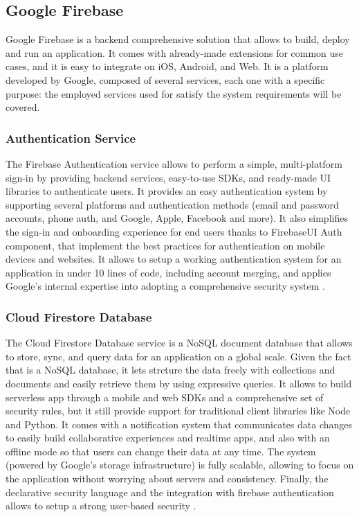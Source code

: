 \subsection{Google Firebase}
Google Firebase is a backend comprehensive solution that allows to build, deploy and run an application. It comes with already-made extensions for common use cases, and it is easy to integrate on iOS, Android, and Web. It is a platform developed by Google, composed of several services, each one with a specific purpose: the employed services used for satisfy the system requirements will be covered.
\subsubsection{Authentication Service}
The Firebase Authentication service allows to perform a simple, multi-platform sign-in by providing backend services, easy-to-use SDKs, and ready-made UI libraries to authenticate users. It provides an easy authentication system by supporting several platforms and authentication methods (email and password accounts, phone auth, and Google, Apple, Facebook and more). It also simplifies the sign-in and onboarding experience for end users thanks to FirebaseUI Auth component, that implement the best practices for authentication on mobile devices and websites. It allows to setup a working authentication system for an application in under 10 lines of code, including account merging, and applies Google's internal expertise into adopting a comprehensive security system \cite{FirebaseAuthentication}.
\subsubsection{Cloud Firestore Database}
The Cloud Firestore Database service is a NoSQL document database that allows to store, sync, and query data for an application on a global scale. Given the fact that is a NoSQL database, it lets strcture the data freely with collections and documents and easily retrieve them by using expressive queries. It allows to build serverless app through a mobile and web SDKs and a comprehensive set of security rules, but it still provide support for traditional client libraries like Node and Python. It comes with a notification system that communicates data changes to easily build collaborative experiences and realtime apps, and also with an offline mode so that users can change their data at any time. The system (powered by Google's storage infrastructure) is fully scalable, allowing to focus on the application without worrying about servers and consistency. Finally, the declarative security language and the integration with firebase authentication allows to setup a strong user-based security \cite{CloudFirestore}.
